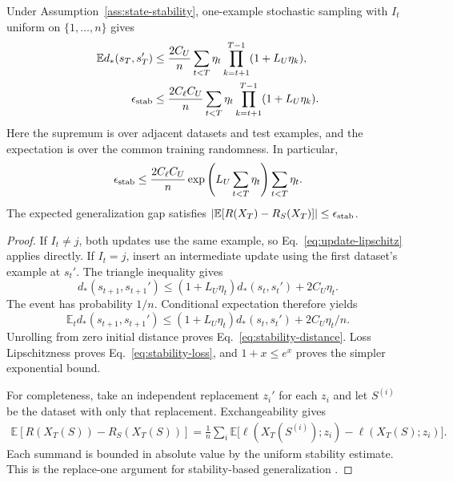 \begin{theorem}
\label{thm:stability}
Under Assumption~\ref{ass:state-stability}, one-example stochastic
sampling with $I_t$ uniform on $\{1,\ldots,n\}$ gives
\begin{align}
 \mathbb E d_*(s_T,s_T')
 &\leq\frac{2C_U}{n}\sum_{t<T}\eta_t
                  \prod_{k=t+1}^{T-1}(1+L_U\eta_k),
 \label{eq:stability-distance}\\
 \epsilon_{\rm stab}
 &\leq\frac{2C_\ell C_U}{n}\sum_{t<T}\eta_t
                  \prod_{k=t+1}^{T-1}(1+L_U\eta_k).
 \label{eq:stability-loss}
\end{align}
Here the supremum is over adjacent datasets and test examples, and the
expectation is over the common training randomness. In particular,
\begin{equation}
 \epsilon_{\rm stab}\leq\frac{2C_\ell C_U}{n}
    \exp\left(L_U\sum_{t<T}\eta_t\right)\sum_{t<T}\eta_t.
 \label{eq:nonconvex-stability-exp}
\end{equation}
The expected generalization gap satisfies
$|\mathbb E[R(X_T)-R_S(X_T)]|\leq\epsilon_{\rm stab}$.
\end{theorem}
\begin{proof}
If $I_t\ne j$, both updates use the same example, so
Eq.~\eqref{eq:update-lipschitz} applies directly. If $I_t=j$, insert an
intermediate update using the first dataset's example at $s_t'$.
The triangle inequality gives
\begin{equation}
 d_*(s_{t+1},s_{t+1}')\leq
 (1+L_U\eta_t)d_*(s_t,s_t')+2C_U\eta_t.
\end{equation}
The event has probability $1/n$. Conditional expectation therefore yields
\begin{equation}
 \mathbb E_t d_*(s_{t+1},s_{t+1}')\leq
 (1+L_U\eta_t)d_*(s_t,s_t')+2C_U\eta_t/n.
\end{equation}
Unrolling from zero initial distance proves
Eq.~\eqref{eq:stability-distance}. Loss Lipschitzness proves
Eq.~\eqref{eq:stability-loss}, and $1+x\leq e^x$ proves the simpler
exponential bound.

For completeness, take an independent replacement $z_i'$ for each $z_i$
and let $S^{(i)}$ be the dataset with only that replacement. Exchangeability
gives
\begin{align}
 \mathbb E[R(X_T(S))-R_S(X_T(S))]
 =\frac1n\sum_i\mathbb E\big[
 \ell(X_T(S^{(i)});z_i)-\ell(X_T(S);z_i)\big].
\end{align}
Each summand is bounded in absolute value by the uniform stability
estimate. This is the replace-one argument for stability-based
generalization \cite{bousquet2002stability,hardt2016train}.
\end{proof}

